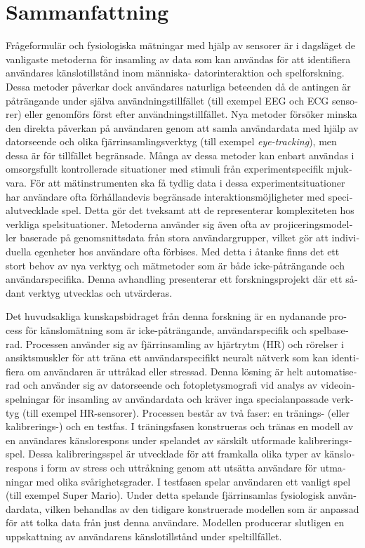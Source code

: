 \chapter*{Sammanfattning}

\begin{otherlanguage}{swedish}

Frågeformulär och fysiologiska mätningar med hjälp av sensorer är i dagsläget de vanligaste metoderna för insamling av data som kan användas för att identifiera användares känslotillstånd inom människa- datorinteraktion och spelforskning. Dessa metoder påverkar dock användares naturliga beteenden då de antingen är påträngande under själva användningstillfället (till exempel EEG och ECG sensorer) eller genomförs först efter användningstillfället. Nya metoder försöker minska den direkta påverkan på användaren genom att samla användardata med hjälp av datorseende och olika fjärrinsamlingsverktyg (till exempel \textit{eye-tracking}), men dessa är för tillfället begränsade. Många av dessa metoder kan enbart användas i omsorgsfullt kontrollerade situationer med stimuli från experimentspecifik mjukvara. För att mätinstrumenten ska få tydlig data i dessa experimentsituationer har användare ofta förhållandevis begränsade interaktionsmöjligheter med specialutvecklade spel. Detta gör det tveksamt att de representerar komplexiteten hos verkliga spelsituationer. Metoderna använder sig även ofta av projiceringsmodeller baserade på genomsnittsdata från stora användargrupper, vilket gör att individuella egenheter hos användare ofta förbises. Med detta i åtanke finns det ett stort behov av nya verktyg och mätmetoder som är både icke-påträngande och användarspecifika. Denna avhandling presenterar ett forskningsprojekt där ett sådant verktyg utvecklas och utvärderas.

Det huvudsakliga kunskapsbidraget från denna forskning är en nydanande process för känslomätning som är icke-påträngande, användarspecifik och spelbaserad. Processen använder sig av fjärrinsamling av hjärtrytm (HR) och rörelser i ansiktsmuskler för att träna ett användarspecifikt neuralt nätverk som kan identifiera om användaren är uttråkad eller stressad. Denna lösning är helt automatiserad och använder sig av datorseende och fotopletysmografi vid analys av videoinspelningar för insamling av användardata och kräver inga specialanpassade verktyg (till exempel HR-sensorer). Processen består av två faser: en tränings- (eller kalibrerings-) och en testfas. I träningsfasen konstrueras och tränas en modell av en användares känslorespons under spelandet av särskilt utformade kalibreringsspel. Dessa kalibreringsspel är utvecklade för att framkalla olika typer av känslorespons i form av stress och uttråkning genom att utsätta användare för utmaningar med olika svårighetsgrader. I testfasen spelar användaren ett vanligt spel (till exempel Super Mario). Under detta spelande fjärrinsamlas fysiologisk användardata, vilken behandlas av den tidigare konstruerade modellen som är anpassad för att tolka data från just denna användare. Modellen producerar slutligen en uppskattning av användarens känslotillstånd under speltillfället.


\end{otherlanguage}
